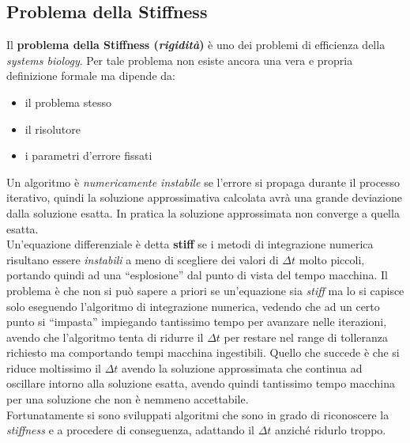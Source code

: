 \documentclass[a4paper,12pt, oneside]{book}
\begin{document}
\subsection{Problema della Stiffness}
Il \textbf{problema della Stiffness (\textit{rigidità})} è uno dei problemi di
efficienza della \textit{systems biology}. Per tale problema non esiste ancora
una vera e propria definizione formale ma dipende da:
\begin{itemize}
  \item il problema stesso
  \item il risolutore
  \item i parametri d'errore fissati
\end{itemize}
Un algoritmo è \textit{numericamente instabile} se l'errore si propaga durante
il processo iterativo, quindi la soluzione approssimativa calcolata avrà una
grande deviazione dalla soluzione esatta. In pratica la soluzione approssimata
non converge a quella esatta.\\
Un'equazione differenziale è detta \textbf{stiff} se i metodi di integrazione
numerica risultano essere \textit{instabili} a meno di scegliere dei valori di
$\Delta t$ molto piccoli, portando quindi ad una ``esplosione'' dal punto di
vista del tempo macchina. Il problema è che non si può sapere a priori se
un'equazione sia \textit{stiff} ma lo si capisce solo eseguendo l'algoritmo di
integrazione numerica, vedendo che ad un certo punto si ``impasta'' impiegando
tantissimo tempo per avanzare nelle iterazioni, avendo che l'algoritmo tenta di
ridurre il $\Delta t$ per restare nel range di tolleranza richiesto ma
comportando tempi macchina ingestibili. Quello che succede è che si riduce
moltissimo il $\Delta t$ avendo la soluzione approssimata che continua ad
oscillare intorno alla soluzione esatta, avendo quindi tantissimo tempo macchina
per una soluzione che non è nemmeno accettabile.\\
Fortunatamente si sono sviluppati algoritmi che sono in grado di riconoscere la
\textit{stiffness} e a procedere di conseguenza, adattando il $\Delta t$ anziché
ridurlo troppo.
\end{document}
